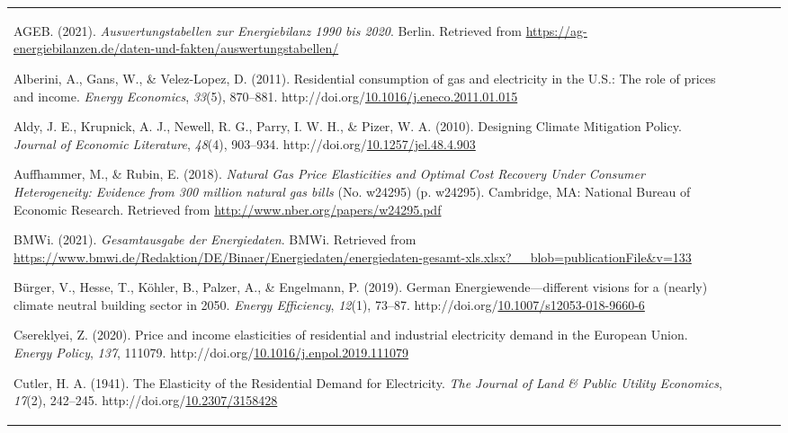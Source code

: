\documentclass[12pt,twoside]{reedthesis}
\newlength{\cslhangindent}
\newenvironment{CSLReferences}[2] %
 {%
  \setlength{\parindent}{0pt}
  \ifodd #1 \everypar{\setlength{\hangindent}{\cslhangindent}}\ignorespaces\fi
  \ifnum #2 > 0
  \setlength{\parskip}{#2\baselineskip}
  \fi
 }%
 {}
\begin{document}
\begin{tabular}{@{}lllll@{}}
\hypertarget{refs}{}
\begin{CSLReferences}{1}{0}
\leavevmode\vadjust pre{\hypertarget{ref-ageb21}{}}%
AGEB. (2021). \emph{Auswertungstabellen zur Energiebilanz 1990 bis 2020}. Berlin. Retrieved from \url{https://ag-energiebilanzen.de/daten-und-fakten/auswertungstabellen/}

\leavevmode\vadjust pre{\hypertarget{ref-alberini_etal11}{}}%
Alberini, A., Gans, W., \& Velez-Lopez, D. (2011). Residential consumption of gas and electricity in the U.S.: The role of prices and income. \emph{Energy Economics}, \emph{33}(5), 870--881. http://doi.org/\href{https://doi.org/10.1016/j.eneco.2011.01.015}{10.1016/j.eneco.2011.01.015}

\leavevmode\vadjust pre{\hypertarget{ref-aldy_etal10}{}}%
Aldy, J. E., Krupnick, A. J., Newell, R. G., Parry, I. W. H., \& Pizer, W. A. (2010). Designing Climate Mitigation Policy. \emph{Journal of Economic Literature}, \emph{48}(4), 903--934. http://doi.org/\href{https://doi.org/10.1257/jel.48.4.903}{10.1257/jel.48.4.903}

\leavevmode\vadjust pre{\hypertarget{ref-auffhammer_rubin18}{}}%
Auffhammer, M., \& Rubin, E. (2018). \emph{Natural Gas Price Elasticities and Optimal Cost Recovery Under Consumer Heterogeneity: Evidence from 300 million natural gas bills} (No. w24295) (p. w24295). Cambridge, MA: National Bureau of Economic Research. Retrieved from \url{http://www.nber.org/papers/w24295.pdf}

\leavevmode\vadjust pre{\hypertarget{ref-bmwi21}{}}%
BMWi. (2021). \emph{Gesamtausgabe der Energiedaten}. BMWi. Retrieved from \url{https://www.bmwi.de/Redaktion/DE/Binaer/Energiedaten/energiedaten-gesamt-xls.xlsx?__blob=publicationFile\&v=133}

\leavevmode\vadjust pre{\hypertarget{ref-burger_etal19}{}}%
Bürger, V., Hesse, T., Köhler, B., Palzer, A., \& Engelmann, P. (2019). German Energiewende---different visions for a (nearly) climate neutral building sector in 2050. \emph{Energy Efficiency}, \emph{12}(1), 73--87. http://doi.org/\href{https://doi.org/10.1007/s12053-018-9660-6}{10.1007/s12053-018-9660-6}

\leavevmode\vadjust pre{\hypertarget{ref-csereklyei20}{}}%
Csereklyei, Z. (2020). Price and income elasticities of residential and industrial electricity demand in the European Union. \emph{Energy Policy}, \emph{137}, 111079. http://doi.org/\href{https://doi.org/10.1016/j.enpol.2019.111079}{10.1016/j.enpol.2019.111079}

\leavevmode\vadjust pre{\hypertarget{ref-cutler41}{}}%
Cutler, H. A. (1941). The Elasticity of the Residential Demand for Electricity. \emph{The Journal of Land \& Public Utility Economics}, \emph{17}(2), 242--245. http://doi.org/\href{https://doi.org/10.2307/3158428}{10.2307/3158428}


\end{CSLReferences}
\end{tabular}
\end{document}
